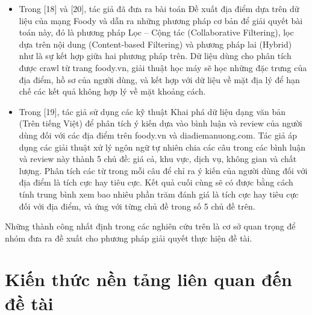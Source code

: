 \documentclass[12pt]{extarticle}
\begin{document}
			\begin{itemize}
				\item Trong [18] và [20], tác giả đã đưa ra bài toán Đề xuất địa điểm dựa trên dữ liệu của mạng Foody và dẫn ra những phương pháp cơ bản để giải quyết bài toán này, đó là phương pháp Lọc – Cộng tác (Collaborative Filtering), lọc dựa trên nội dung (Content-based Filtering) và phương pháp lai (Hybrid) như là sự kết hợp giữa hai phương pháp trên. Dữ liệu dùng cho phân tích được crawl từ trang foody.vn, giải thuật học máy sẽ học những đặc trưng của địa điểm, hồ sơ của người dùng, và kết hợp với dữ liệu về mặt địa lý để hạn chế các kết quả không hợp lý về mặt khoảng cách. 
				\item Trong [19], tác giả sử dụng các kỹ thuật Khai phá dữ liệu dạng văn bản (Trên tiếng Việt) để phân tích ý kiến dựa vào bình luận và review của người dùng đối với các địa điểm trên foody.vn và diadiemanuong.com. Tác giả áp dụng các giải thuật xử lý ngôn ngữ tự nhiên chia các câu trong các bình luận và review này thành 5 chủ đề: giá cả, khu vực, dịch vụ, không gian và chất lượng. Phân tích các từ trong mỗi câu để chỉ ra ý kiến của người dùng đối với địa điểm là tích cực hay tiêu cực. Kết quả cuối cùng sẽ có được bằng cách tính trung bình xem bao nhiêu phần trăm đánh giá là tích cực hay tiêu cực đối với địa điểm, và ứng với từng chủ đề trong số 5 chủ đề trên.   
				\end{itemize}
			\par Những thành công nhất định trong các nghiên cứu trên là cơ sở quan trọng để nhóm đưa ra đề xuất cho phương pháp giải quyết thực hiện đề tài.


\section{Kiến thức nền tảng liên quan đến đề tài}
\end{document}
